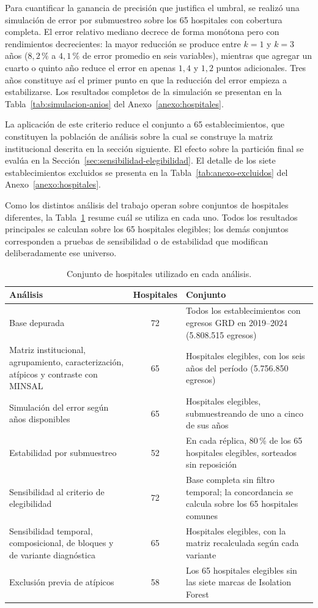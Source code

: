 Para cuantificar la ganancia de precisión que justifica el umbral, se realizó
una simulación de error por submuestreo sobre los 65 hospitales con cobertura
completa. El error relativo mediano decrece de forma monótona pero con
rendimientos decrecientes: la mayor reducción se produce entre $k=1$ y $k=3$
años ($8{,}2\,\%$ a $4{,}1\,\%$ de error promedio en seis variables), mientras
que agregar un cuarto o quinto año reduce el error en apenas $1{,}4$ y
$1{,}2$ puntos adicionales. Tres años constituye así el primer punto en que la
reducción del error empieza a estabilizarse. Los resultados completos de la
simulación se presentan en la
Tabla~\ref{tab:simulacion-anios} del Anexo~\ref{anexo:hospitales}.

La aplicación de este criterio reduce el conjunto a 65 establecimientos, que
constituyen la población de análisis sobre la cual se construye la matriz
institucional descrita en la sección siguiente. El efecto sobre la partición
final se evalúa en la Sección~\ref{sec:sensibilidad-elegibilidad}. El detalle
de los siete establecimientos excluidos se presenta en la
Tabla~\ref{tab:anexo-excluidos} del Anexo~\ref{anexo:hospitales}.

Como los distintos análisis del trabajo operan sobre conjuntos de hospitales
diferentes, la Tabla~\ref{tab:universos} resume cuál se utiliza en cada uno.
Todos los resultados principales se calculan sobre los 65 hospitales
elegibles; los demás conjuntos corresponden a pruebas de sensibilidad o de
estabilidad que modifican deliberadamente ese universo.

\begin{table}[htbp]
\centering
\caption{Conjunto de hospitales utilizado en cada análisis.}
\label{tab:universos}
\begin{tabularx}{\textwidth}{>{\raggedright\arraybackslash}X c >{\raggedright\arraybackslash}X}
\toprule
\textbf{Análisis} & \textbf{Hospitales} & \textbf{Conjunto} \\
\midrule
Base depurada & 72 & Todos los establecimientos con egresos GRD en 2019--2024 (5.808.515 egresos) \\
Matriz institucional, agrupamiento, caracterización, atípicos y contraste con MINSAL & 65 & Hospitales elegibles, con los seis años del período (5.756.850 egresos) \\
Simulación del error según años disponibles & 65 & Hospitales elegibles, submuestreando de uno a cinco de sus años \\
Estabilidad por submuestreo & 52 & En cada réplica, 80\,\% de los 65 hospitales elegibles, sorteados sin reposición \\
Sensibilidad al criterio de elegibilidad & 72 & Base completa sin filtro temporal; la concordancia se calcula sobre los 65 hospitales comunes \\
Sensibilidad temporal, composicional, de bloques y de variante diagnóstica & 65 & Hospitales elegibles, con la matriz recalculada según cada variante \\
Exclusión previa de atípicos & 58 & Los 65 hospitales elegibles sin las siete marcas de Isolation Forest \\
\bottomrule
\end{tabularx}
\end{table}


